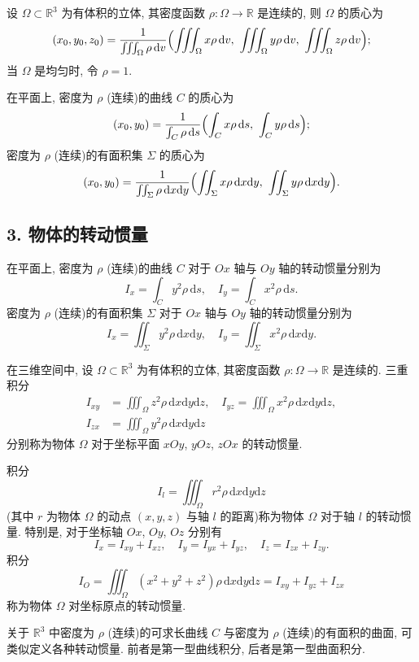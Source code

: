 设 $\Omega\subset\mathbb{R}^{3}$ 为有体积的立体, 其密度函数 $\rho:\Omega\to\mathbb{R}$ 是连续的, 则 $\Omega$ 的质心为
\[
(x_{0},y_{0},z_{0})=\frac{1}{\iiint_{\Omega}\rho\,\mathrm{d}v}\Bigl(\iiint_{\Omega}x\rho\,\mathrm{d}v,\ \iiint_{\Omega}y\rho\,\mathrm{d}v,\ \iiint_{\Omega}z\rho\,\mathrm{d}v\Bigr);
\]
当 $\Omega$ 是均匀时, 令 $\rho=1$.

在平面上, 密度为 $\rho$ (连续)的曲线 $C$ 的质心为
\[
(x_{0},y_{0})=\frac{1}{\int_{C}\rho\,\mathrm{d}s}\Bigl(\int_{C}x\rho\,\mathrm{d}s,\ \int_{C}y\rho\,\mathrm{d}s\Bigr);
\]
密度为 $\rho$ (连续)的有面积集 $\Sigma$ 的质心为
\[
(x_{0},y_{0})=\frac{1}{\iint_{\Sigma}\rho\,\mathrm{d}x\mathrm{d}y}\Bigl(\iint_{\Sigma}x\rho\,\mathrm{d}x\mathrm{d}y,\ \iint_{\Sigma}y\rho\,\mathrm{d}x\mathrm{d}y\Bigr).
\]

\subsection*{3. 物体的转动惯量}

在平面上, 密度为 $\rho$ (连续)的曲线 $C$ 对于 $Ox$ 轴与 $Oy$ 轴的转动惯量分别为
\[
I_{x}=\int_{C}y^{2}\rho\,\mathrm{d}s,\quad I_{y}=\int_{C}x^{2}\rho\,\mathrm{d}s.
\]
密度为 $\rho$ (连续)的有面积集 $\Sigma$ 对于 $Ox$ 轴与 $Oy$ 轴的转动惯量分别为
\[
I_{x}=\iint_{\Sigma}y^{2}\rho\,\mathrm{d}x\mathrm{d}y,\quad I_{y}=\iint_{\Sigma}x^{2}\rho\,\mathrm{d}x\mathrm{d}y.
\]

在三维空间中, 设 $\Omega\subset\mathbb{R}^{3}$ 为有体积的立体, 其密度函数 $\rho:\Omega\to\mathbb{R}$ 是连续的. 三重积分
\[
\begin{aligned}
I_{xy}&=\iiint_{\Omega}z^{2}\rho\,\mathrm{d}x\mathrm{d}y\mathrm{d}z,\quad I_{yz}=\iiint_{\Omega}x^{2}\rho\,\mathrm{d}x\mathrm{d}y\mathrm{d}z,\\
I_{zx}&=\iiint_{\Omega}y^{2}\rho\,\mathrm{d}x\mathrm{d}y\mathrm{d}z
\end{aligned}
\]
分别称为物体 $\Omega$ 对于坐标平面 $xOy$, $yOz$, $zOx$ 的转动惯量.

积分
\[
I_{l}=\iiint_{\Omega}r^{2}\rho\,\mathrm{d}x\mathrm{d}y\mathrm{d}z
\]
(其中 $r$ 为物体 $\Omega$ 的动点 $(x,y,z)$ 与轴 $l$ 的距离)称为物体 $\Omega$ 对于轴 $l$ 的转动惯量. 特别是, 对于坐标轴 $Ox$, $Oy$, $Oz$ 分别有
\[
I_{x}=I_{xy}+I_{xz},\quad I_{y}=I_{yx}+I_{yz},\quad I_{z}=I_{zx}+I_{zy}.
\]
积分
\[
I_{O}=\iiint_{\Omega}(x^{2}+y^{2}+z^{2})\rho\,\mathrm{d}x\mathrm{d}y\mathrm{d}z=I_{xy}+I_{yz}+I_{zx}
\]
称为物体 $\Omega$ 对坐标原点的转动惯量.

关于 $\mathbb{R}^{3}$ 中密度为 $\rho$ (连续)的可求长曲线 $C$ 与密度为 $\rho$ (连续)的有面积的曲面, 可类似定义各种转动惯量. 前者是第一型曲线积分, 后者是第一型曲面积分.

